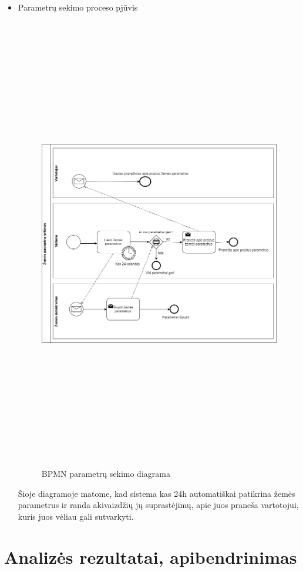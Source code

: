 \documentclass[oneside]{VUMIFPSkursinis}
\begin{document}
\pagebreak
	\begin{itemize}
	\item Parametrų sekimo proceso pjūvis
	\begin{figure}[H]
		\centering	
	\includegraphics[width=18cm,height=20cm,keepaspectratio]{BPMN_ParametruSekimas.png}
	\caption{BPMN parametrų sekimo diagrama}
	\label{fig:BPMN_ParametruSekimas}
\end{figure}
Šioje diagramoje matome, kad sistema kas 24h automatiškai patikrina žemės parametrus ir randa akivaizdžių jų suprastėjimų, apie juos praneša vartotojui, kuris juos vėliau gali sutvarkyti.
\end{itemize}

\section{Analizės rezultatai, apibendrinimas}
\end{document}
